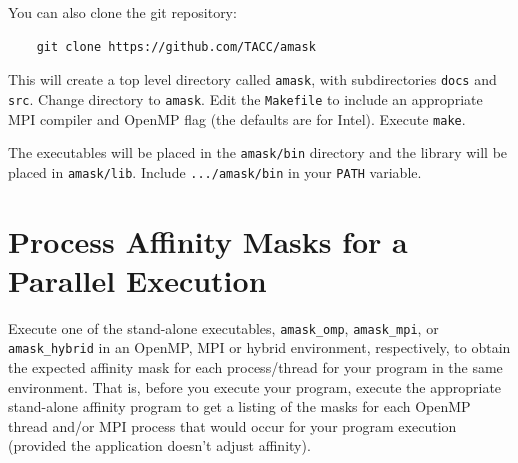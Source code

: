 \documentclass[10pt,a4paper]{report}
\begin{document}
You can also clone the git repository:

\begin{verbatim}
    git clone https://github.com/TACC/amask
\end{verbatim}

This will create a top level directory called \verb+amask+, with subdirectories 
\verb+docs+ and \verb+src+.  Change directory to  \verb+amask+. Edit the \verb+Makefile+ to include an appropriate
MPI compiler and OpenMP flag (the defaults are for Intel).  Execute \verb+make+.





The executables will be placed in the \verb+amask/bin+ directory and the library 
will be placed in \verb+amask/lib+. Include \verb+.../amask/bin+ in your \verb+PATH+ variable.

\FloatBarrier
\chapter{Process Affinity Masks for a Parallel Execution}


Execute one of the stand-alone executables, \verb+amask_omp+, \verb+amask_mpi+, or \\
\verb+amask_hybrid+ in an OpenMP, MPI or hybrid environment, 
respectively, to obtain the expected affinity mask for each 
process/thread for your program in the same environment.  That is,
before you execute your program, execute the appropriate stand-alone affinity
program to get a listing of the masks for each OpenMP thread and/or MPI process
that would occur for your program execution (provided the application doesn't adjust affinity).
\end{document}
